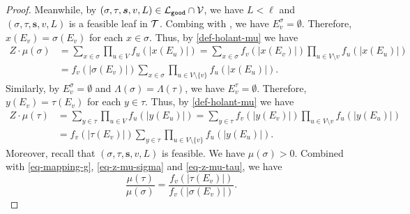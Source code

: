 \documentclass[11pt]{article}
\newcommand{\abs}[1]{\left\vert#1\right\vert}
\def\!#1{\mathtt{#1}}
\newcommand{\seqS}{\boldsymbol{s}}
\begin{document}
\begin{proof}
    Meanwhile, by $(\sigma, \tau, \seqS,v,L) \in \+L_{\!{good}}\cap \+V$, 
    we have $L<\ell$ and $(\sigma, \tau, \seqS,v,L)$ is a feasible leaf in $\mathcal{T}$.
    Combing with ,
    we have $E_v^{\sigma} = \emptyset$. 
    Therefore, $x(E_v) = \sigma(E_v)$ for each $x\in \sigma$.
    Thus, by \eqref{def-holant-mu} we have
    \begin{equation}\label{eq-z-mu-sigma}
    \begin{aligned}
        Z\cdot \mu(\sigma)&= \sum_{x\in \sigma} \prod_{u \in V} f_u\left(\abs{x ({E_u})}\right)=\sum_{x\in \sigma} f_v\left(\abs{x ({E_v})}\right)\prod_{u \in V\setminus v} f_u\left(\abs{x ({E_u})}\right)\\
        &=f_v\left(\abs{\sigma ({E_v})}\right)\sum_{x\in \sigma} \prod_{u \in V\setminus \{v\}} f_u\left(\abs{x ({E_u})}\right).
    \end{aligned}
    \end{equation}
    Similarly, by $E_v^{\sigma} = \emptyset$ and $\Lambda(\sigma) = \Lambda(\tau)$, we have $E_v^{\tau} = \emptyset$. 
    Therefore, $y(E_v) = \tau(E_v)$ for each $y\in \tau$.
    Thus, by \eqref{def-holant-mu} we have 
    \begin{equation}\label{eq-z-mu-tau}
      \begin{aligned}
        Z\cdot\mu(\tau)&= \sum_{y\in \tau} \prod_{u \in V} f_u\left(\abs{y ({E_u})}\right)=\sum_{y\in \tau} f_v\left(\abs{y ({E_v})}\right)\prod_{u \in V\setminus v} f_u\left(\abs{y ({E_u})}\right)\\
        &=f_v\left(\abs{\tau ({E_v})}\right)\sum_{y\in \tau} \prod_{u \in V\setminus \{v\}} f_u\left(\abs{y ({E_u})}\right).
    \end{aligned}
    \end{equation}
    Moreover, recall that $(\sigma,\tau,\seqS,v,L)$ is feasible.
    We have $\mu(\sigma)>0$. Combined with \eqref{eq-mapping-g}, \eqref{eq-z-mu-sigma} and \eqref{eq-z-mu-tau}, we have
    $$
        \frac{\mu(\tau)}{\mu(\sigma)} =  \frac{f_v\left(\abs{\tau(E_v)}\right)}{f_v\left(\abs{\sigma({E_v})}\right)}.
    $$
\end{proof}
\end{document}
